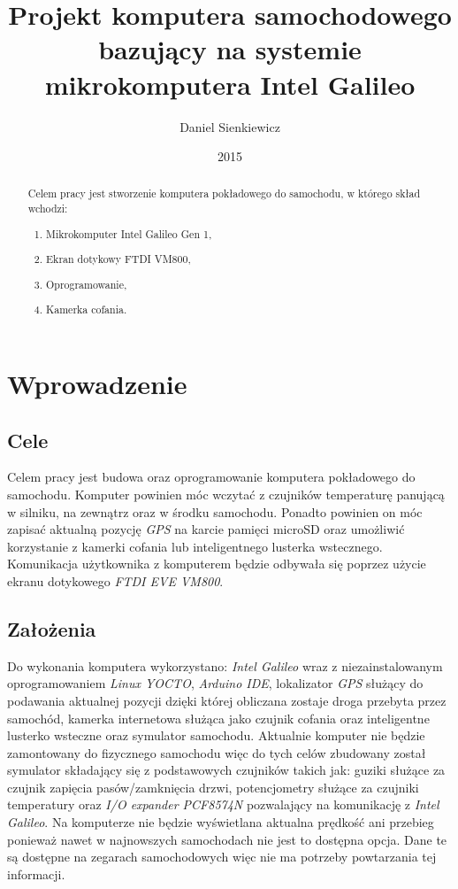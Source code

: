 \documentclass{xmgr}
\author   {Daniel Sienkiewicz}
\title    {Projekt komputera samochodowego bazujący na systemie mikrokomputera Intel Galileo}
\date     {2015}
\begin{document}
\begin{abstract}
Celem pracy jest stworzenie komputera pokładowego do samochodu, w którego skład wchodzi: \begin{enumerate}
\item Mikrokomputer Intel Galileo Gen 1, 
\item Ekran dotykowy FTDI VM800, 
\item Oprogramowanie,
\item Kamerka cofania.
\end{enumerate}

\end{abstract}
\maketitle

\chapter{Wprowadzenie}
\section{Cele}
Celem pracy jest budowa oraz oprogramowanie komputera pokładowego do samochodu. Komputer powinien móc wczytać z czujników temperaturę panującą w silniku, na zewnątrz oraz w środku samochodu. Ponadto powinien on móc zapisać aktualną pozycję \emph{GPS} na karcie pamięci microSD oraz umożliwić korzystanie z kamerki cofania lub inteligentnego lusterka wstecznego. Komunikacja użytkownika z komputerem będzie odbywała się poprzez użycie ekranu dotykowego \emph{FTDI EVE VM800}.
\section{Założenia}
Do wykonania komputera wykorzystano: \emph{Intel Galileo} wraz z niezainstalowanym oprogramowaniem \emph{Linux YOCTO}, \emph{Arduino IDE}, lokalizator \emph{GPS} służący do podawania aktualnej pozycji dzięki której obliczana zostaje droga przebyta przez samochód, kamerka internetowa służąca jako czujnik cofania oraz inteligentne lusterko wsteczne oraz symulator samochodu. Aktualnie komputer nie będzie zamontowany do fizycznego samochodu więc do tych celów zbudowany został symulator składający się z podstawowych czujników takich jak: guziki służące za czujnik zapięcia pasów/zamknięcia drzwi, potencjometry służące za czujniki temperatury oraz \emph{I/O expander PCF8574N} pozwalający na komunikację z \emph{Intel Galileo}. Na komputerze nie będzie wyświetlana aktualna prędkość ani przebieg ponieważ nawet w najnowszych samochodach nie jest to dostępna opcja. Dane te są dostępne na zegarach samochodowych więc nie ma potrzeby powtarzania tej informacji.
\end{document}
